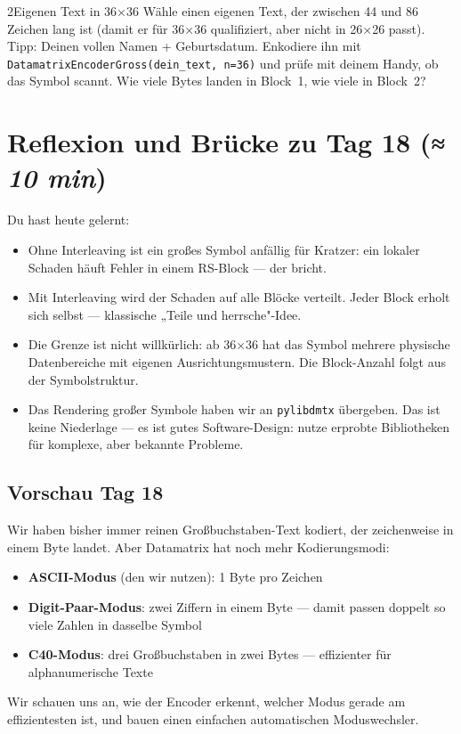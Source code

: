 \begin{bleistiftuebung}{2}{Eigenen Text in 36×36}
Wähle einen eigenen Text, der zwischen 44 und 86 Zeichen lang ist
(damit er für 36×36 qualifiziert, aber nicht in 26×26 passt). Tipp:
Deinen vollen Namen + Geburtsdatum. Enkodiere ihn mit
\texttt{DatamatrixEncoderGross(dein\_text, n=36)} und prüfe mit deinem
Handy, ob das Symbol scannt. Wie viele Bytes landen in Block~1,
wie viele in Block~2?
\end{bleistiftuebung}

\section{Reflexion und Brücke zu Tag 18 \normalfont(\textit{≈ 10 min})}

Du hast heute gelernt:

\begin{itemize}
\item Ohne Interleaving ist ein großes Symbol anfällig für Kratzer:
  ein lokaler Schaden häuft Fehler in einem RS-Block — der bricht.
\item Mit Interleaving wird der Schaden auf alle Blöcke verteilt.
  Jeder Block erholt sich selbst — klassische „Teile und herrsche"-Idee.
\item Die Grenze ist nicht willkürlich: ab 36×36 hat das Symbol
  mehrere physische Datenbereiche mit eigenen Ausrichtungs­mustern.
  Die Block-Anzahl folgt aus der Symbolstruktur.
\item Das Rendering großer Symbole haben wir an \texttt{pylibdmtx}
  übergeben. Das ist keine Niederlage — es ist gutes Software-Design:
  nutze erprobte Bibliotheken für komplexe, aber bekannte Probleme.
\end{itemize}

\subsection*{Vorschau Tag 18}

Wir haben bisher immer reinen Großbuchstaben-Text kodiert, der
zeichenweise in einem Byte landet. Aber Datamatrix hat noch mehr
Kodierungs­modi:

\begin{itemize}
\item \textbf{ASCII-Modus} (den wir nutzen): 1 Byte pro Zeichen
\item \textbf{Digit-Paar-Modus}: zwei Ziffern in einem Byte —
  damit passen doppelt so viele Zahlen in dasselbe Symbol
\item \textbf{C40-Modus}: drei Großbuchstaben in zwei Bytes —
  effizienter für alphanumerische Texte
\end{itemize}

Wir schauen uns an, wie der Encoder erkennt, welcher Modus gerade
am effizientesten ist, und bauen einen einfachen automatischen
Moduswechsler.
